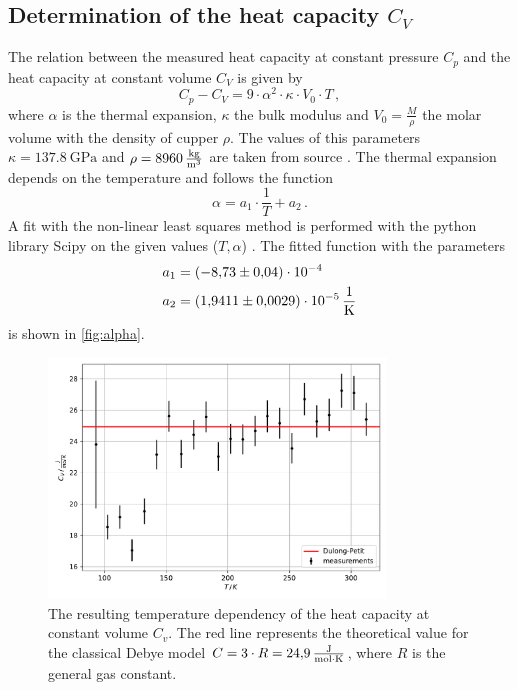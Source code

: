 \subsection{Determination of the heat capacity $C_V$}
The relation between the measured heat capacity at constant pressure $C_p$ and the heat capacity at constant volume $C_V$ is given by  %
\begin{equation}
        C_p - C_V = 9 \cdot \alpha^2 \cdot \kappa \cdot V_0 \cdot T \, ,
        \label{eqn:C_relation}
\end{equation}
where $\alpha$ is the thermal expansion, $\kappa$ the bulk modulus and $V_0 = \frac{M}{\rho}$ the molar volume with the density of cupper $\rho$.
The values of this parameters $\kappa = \qty{137.8}{\giga\pascal}$ and $\rho = \qty{8960}{\frac{\kilogram}{\metre^3}}$ are taken from source \cite{goodfellow}.
The thermal expansion depends on the temperature and follows the function
\begin{equation}
    \alpha = a_1 \cdot \frac{1}{T} + a_2 \, .
\end{equation}
A fit with the non-linear least squares method is performed with the python library Scipy\cite{scipy} on the given values ($T, \alpha$) \cite{V47}.
The fitted function with the parameters
\begin{align*}
    a_1 &= \qty{-8.73(4)e-04}{} \\
    a_2 &= \qty{1.9411(29)e-05}{\frac{1}{\kelvin}}
\end{align*}
is shown in \autoref{fig:alpha}.
\begin{figure}
    \centering
    \includegraphics[width=0.8\textwidth]{content/plots/C_v.pdf}
    \caption{The resulting temperature dependency of the heat capacity at constant volume $C_v$.
    The red line represents the theoretical value for the classical Debye model $C = 3 \cdot R = \qty{24.9}{\frac{\joule}{\mol \cdot \kelvin}}$, where $R$ is the general gas constant.
    }
    \label{fig:alpha}
\end{figure}
